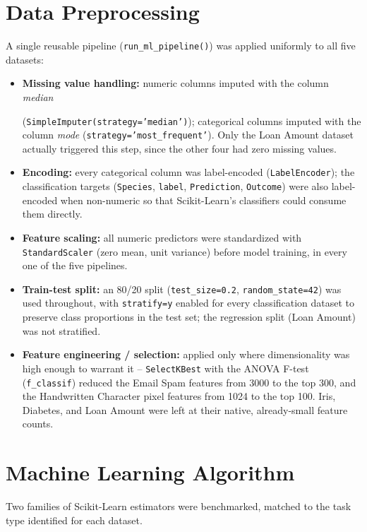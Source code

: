 \documentclass[12pt,a4paper]{article}
\begin{document}
\section{Data Preprocessing}
A single reusable pipeline (\texttt{run\_ml\_pipeline()}) was applied uniformly to all five datasets:
\begin{itemize}
\item \textbf{Missing value handling:} 
numeric columns imputed with the column \emph{median} 
 
(\texttt{SimpleImputer(strategy='median')}); categorical columns imputed with the column \emph{mode} (\texttt{strategy='most\_frequent'}). Only the Loan Amount dataset actually triggered this step, since the other four had zero missing values.
\item \textbf{Encoding:} 
every categorical column was label-encoded (\texttt{LabelEncoder}); the classification targets (\texttt{Species}, \texttt{label}, \texttt{Prediction}, \texttt{Outcome}) were also label-encoded when non-numeric so that Scikit-Learn's classifiers could consume them directly.
\item \textbf{Feature scaling:} 
all numeric predictors were standardized with \texttt{StandardScaler} (zero mean, unit variance) before model training, in every one of the five pipelines.
\item \textbf{Train-test split:} 
an 80/20 split (\texttt{test\_size=0.2}, \texttt{random\_state=42}) was used throughout, with \texttt{stratify=y} enabled for every classification dataset to preserve class proportions in the test set; the regression split (Loan Amount) was not stratified.
\item \textbf{Feature engineering / selection:} 
applied only where dimensionality was high enough to warrant it -- \texttt{SelectKBest} with the ANOVA F-test (\texttt{f\_classif}) reduced the Email Spam features from 3000 to the top 300, and the Handwritten Character pixel features from 1024 to the top 100. Iris, Diabetes, and Loan Amount were left at their native, already-small feature counts.
\end{itemize}
 
\section{Machine Learning Algorithm}
Two families of Scikit-Learn estimators were benchmarked, matched to the task type identified for each dataset.
 
\end{document}
